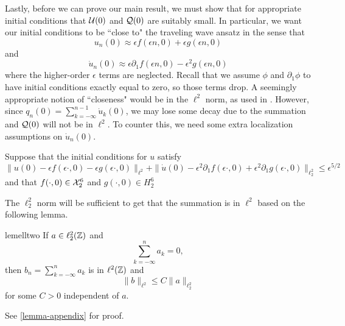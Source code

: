 

Lastly, before we can prove our main result, we must show that for appropriate initial conditions that \(\mathcal{U}(0)\) and \(\mathcal{Q}(0)\) are suitably small. In particular, we want our initial conditions to be ``close to" the traveling wave ansatz in the sense that 
\begin{equation}
	u_n(0) \approx \epsilon f(\epsilon n , 0) + \epsilon g(\epsilon n , 0)
\end{equation}
and 
\begin{equation}
	\dot u_n(0) \approx \epsilon \partial_1 f(\epsilon n , 0) -\epsilon^2 g(\epsilon n,0)
\end{equation}
where the higher-order \(\epsilon\) terms are neglected. Recall that we assume \(\phi\) and \(\partial_1\phi\) to have initial conditions exactly equal to zero, so those terms drop. A seemingly appropriate notion of ``closeness" would be in the \(\ell^2\) norm, as used in \cite{khan2017long,schneider2000counter}. However, since \(q_n(0) = \sum_{k=-\infty}^{n-1} \dot u_{k}(0)\), we may lose some decay due to the summation and \(\mathcal{Q}(0)\) will not be in \(\ell^2\). To counter this, we need some extra localization assumptions on \(\dot u_n(0)\).

\begin{assum}\label{assumption-3}
	Suppose that the initial conditions for \(u\) satisfy
	\begin{equation}
		\| u(0) - \epsilon f(\epsilon \cdot, 0) - \epsilon g(\epsilon \cdot, 0) \|_{\ell^2} + \| \dot u(0) - \epsilon^2 \partial_1 f(\epsilon \cdot, 0) + \epsilon^2 \partial_1 g (\epsilon \cdot , 0) \|_{\ell^2_2} \leq \epsilon^{5/2}
	\end{equation}
	and that \(f(\cdot, 0) \in \mathcal{X}^6_2\) and \(g(\cdot, 0) \in H^6_2\)
\end{assum}

The \(\ell^2_2\) norm will be sufficient to get that the summation is in \(\ell^2\) based on the following lemma.
\begin{restatable}{lem}{elltwo}
\label{ell22-lemma}
	If \(a\in \ell^2_2(\mathbb{Z})\) and 
	\begin{equation}
		\sum_{k=-\infty}^n a_k = 0,
	\end{equation}
	then \(b_n = \sum_{k=-\infty}^n a_k\) is in \(\ell^2(\mathbb{Z})\) and 
	\begin{equation}
		\|b\|_{\ell^2} \leq C \|a\|_{\ell^2_2}
	\end{equation}
	for some \(C> 0\) independent of \(a\).
\end{restatable} 
See \cref{lemma-appendix} for proof.


